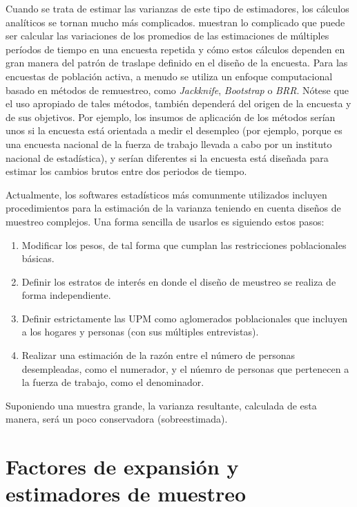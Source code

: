 \documentclass[12pt,spanish,]{book}
\providecommand{\tightlist}{%
  \setlength{\itemsep}{0pt}\setlength{\parskip}{0pt}}
\begin{document}
Cuando se trata de estimar las varianzas de este tipo de estimadores, los cálculos analíticos se tornan mucho más complicados. \textcite{Train_Cahoon_Makens_1978} muestran lo complicado que puede ser calcular las variaciones de los promedios de las estimaciones de múltiples períodos de tiempo en una encuesta repetida y cómo estos cálculos dependen en gran manera del patrón de traslape definido en el diseño de la encuesta. Para las encuestas de población activa, a menudo se utiliza un enfoque computacional basado en métodos de remuestreo, como \emph{Jackknife}, \emph{Bootstrap} o \emph{BRR}. Nótese que el uso apropiado de tales métodos, también dependerá del origen de la encuesta y de sus objetivos. Por ejemplo, los insumos de aplicación de los métodos serían unos si la encuesta está orientada a medir el desempleo (por ejemplo, porque es una encuesta nacional de la fuerza de trabajo llevada a cabo por un instituto nacional de estadística), y serían diferentes si la encuesta está diseñada para estimar los cambios brutos entre dos periodos de tiempo.

Actualmente, los softwares estadísticos más comunmente utilizados incluyen procedimientos para la estimación de la varianza teniendo en cuenta diseños de muestreo complejos. Una forma sencilla de usarlos es siguiendo estos pasos:

\begin{enumerate}
\def\labelenumi{\arabic{enumi}.}
\tightlist
\item
  Modificar los pesos, de tal forma que cumplan las restricciones poblacionales básicas.
\item
  Definir los estratos de interés en donde el diseño de meustreo se realiza de forma independiente.
\item
  Definir estrictamente las UPM como aglomerados poblacionales que incluyen a los hogares y personas (con sus múltiples entrevistas).
\item
  Realizar una estimación de la razón entre el número de personas desempleadas, como el numerador, y el núemro de personas que pertenecen a la fuerza de trabajo, como el denominador.
\end{enumerate}

Suponiendo una muestra grande, la varianza resultante, calculada de esta manera, será un poco conservadora (sobreestimada).

\hypertarget{factores-de-expansion-y-estimadores-de-muestreo}{%
\section{Factores de expansión y estimadores de muestreo}\label{factores-de-expansion-y-estimadores-de-muestreo}}
\end{document}
